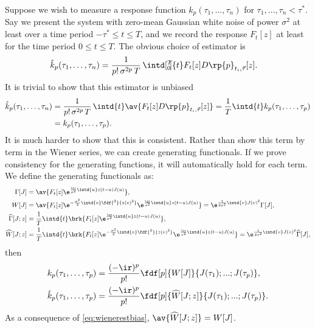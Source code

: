 \documentclass[12pt]{article}
\newcommand{\hz}{\widehat{\Gamma}}
\newcommand{\hw}{\widehat{W}}
\begin{document}
Suppose we wish to measure a response function $k_p(\tau_1,\ldots,\tau_n)$ for $\tau_1,\ldots,\tau_n < \tau^*$.
Say we present the system with zero-mean Gaussian white noise of power $\sigma^2$ at least over a time period $-\tau^* \leq t \leq T$, and we record the response $F_t[z]$ at least for the time period $0 \leq t \leq T$.
The obvious choice of estimator is
%
\begin{equation}\label{eq:wienerest}
  \begin{aligned}
    \hat{k}_p(\tau_1,\ldots,\tau_n) &= \frac{1}{p!\,\sigma^{2p}\,T} \, \intd[_0^T\!\!]{t} F_t[z] D\rp{p}_{t_i,\vec{\tau}}[z] .
  \end{aligned}
\end{equation}
%
It is trivial to show that this estimator is unbiased
%
\begin{equation}\label{eq:wienerestbias}
  \begin{aligned}
    \hat{k}_p(\tau_1,\ldots,\tau_n)
      &= \frac{1}{p!\,\sigma^{2p}\,T} \, \intd{t} \av{F_t[z] D\rp{p}_{t_i,\vec{\tau}}[z]}
      = \frac{1}{T}\intd{t}k_p(\tau_1,\ldots,\tau_p) \\
      &= k_p(\tau_1,\ldots,\tau_p).
  \end{aligned}
\end{equation}
%
It is much harder to show that this is consistent.
Rather than show this term by term in the Wiener series, we can create generating functionals.
If we prove consistency for the generating functions, it will automatically hold for each term.
We define the generating functionals as:
%
\begin{equation}\label{eq:wienergen}
  \begin{aligned}
    \Gamma[J] &= \av{F_t[z] \e^{\frac{\ir}{\sigma^2} \intd{u} z(t-u)J(u)}},  \\
    W[J] &= \av{F_t[z] \e^{-\frac{\sigma^2}{2} \intd{v}\fdf{^2}{z(v)^2}}
            \e^{\frac{\ir}{\sigma^2} \intd{u} z(t-u)J(u)}}
      = \e^{\frac{1}{2\sigma^2} \intd{v}J(v)^2} \Gamma[J],  \\
    \hz[J;z] &= \frac{1}{T}\intd{t} \brk{F_t[z]
                \e^{\frac{\ir}{\sigma^2} \intd{u} z(t-u)J(u)}},  \\
    \hw[J;z] &= \frac{1}{T}\intd{t} \brk{F_t[z]
                \e^{-\frac{\sigma^2}{2} \intd{v}\fdf{^2}{z(v)^2}}
                \e^{\frac{\ir}{\sigma^2} \intd{u} z(t-u)J(u)}}
      = \e^{\frac{1}{2\sigma^2} \intd{v}J(v)^2} \hz[J],
  \end{aligned}
\end{equation}
%
then
%
\begin{equation}\label{eq:wienergendiff}
  \begin{aligned}
    k_p(\tau_1,\ldots,\tau_p)
        &= \frac{(-\ir)^{p}}{p!} \fdf[p]{W[J]}{J(\tau_1);...; J(\tau_p)}, \\
    \hat{k}_p(\tau_1,\ldots,\tau_p)
        &= \frac{(-\ir)^{p}}{p!} \fdf[p]{\hw[J;z]}{J(\tau_1);...;J(\tau_p)}.
  \end{aligned}
\end{equation}
%
As a consequence of \eqref{eq:wienerestbias}, $\av{\hw[J;z]}=W[J]$.
\end{document}

